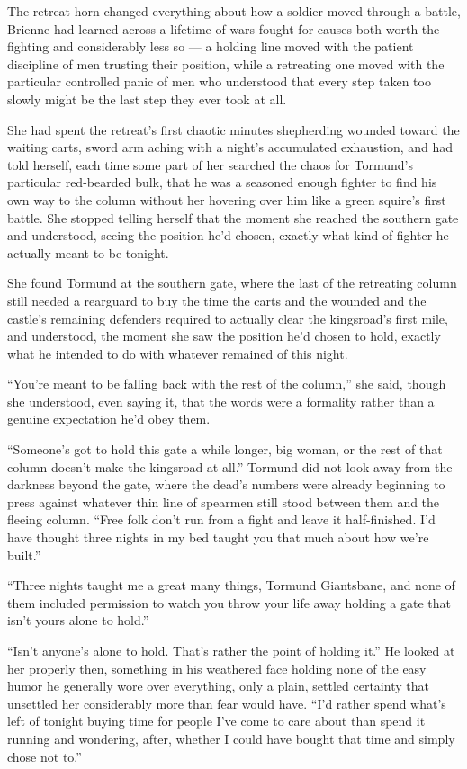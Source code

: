 The retreat horn changed everything about how a soldier moved through a battle, Brienne had learned across a lifetime of wars fought for causes both worth the fighting and considerably less so — a holding line moved with the patient discipline of men trusting their position, while a retreating one moved with the particular controlled panic of men who understood that every step taken too slowly might be the last step they ever took at all.

She had spent the retreat’s first chaotic minutes shepherding wounded toward the waiting carts, sword arm aching with a night’s accumulated exhaustion, and had told herself, each time some part of her searched the chaos for Tormund’s particular red-bearded bulk, that he was a seasoned enough fighter to find his own way to the column without her hovering over him like a green squire’s first battle. She stopped telling herself that the moment she reached the southern gate and understood, seeing the position he’d chosen, exactly what kind of fighter he actually meant to be tonight.

She found Tormund at the southern gate, where the last of the retreating column still needed a rearguard to buy the time the carts and the wounded and the castle’s remaining defenders required to actually clear the kingsroad’s first mile, and understood, the moment she saw the position he’d chosen to hold, exactly what he intended to do with whatever remained of this night.

“You’re meant to be falling back with the rest of the column,” she said, though she understood, even saying it, that the words were a formality rather than a genuine expectation he’d obey them.

“Someone’s got to hold this gate a while longer, big woman, or the rest of that column doesn’t make the kingsroad at all.” Tormund did not look away from the darkness beyond the gate, where the dead’s numbers were already beginning to press against whatever thin line of spearmen still stood between them and the fleeing column. “Free folk don’t run from a fight and leave it half-finished. I’d have thought three nights in my bed taught you that much about how we’re built.”

“Three nights taught me a great many things, Tormund Giantsbane, and none of them included permission to watch you throw your life away holding a gate that isn’t yours alone to hold.”

“Isn’t anyone’s alone to hold. That’s rather the point of holding it.” He looked at her properly then, something in his weathered face holding none of the easy humor he generally wore over everything, only a plain, settled certainty that unsettled her considerably more than fear would have. “I’d rather spend what’s left of tonight buying time for people I’ve come to care about than spend it running and wondering, after, whether I could have bought that time and simply chose not to.”

